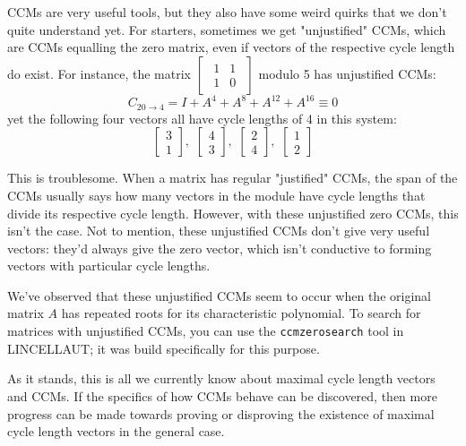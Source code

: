 \documentclass[a4paper, 12pt, reqno]{amsart}
\begin{document}
		CCMs are very useful tools, but they also have some weird quirks that we don't quite understand yet.
		For starters, sometimes we get "unjustified" CCMs, which are CCMs equalling the zero matrix, even if
		vectors of the respective cycle length do exist. For instance, the matrix 
		$
			\begin{bmatrix}
				\begin{smallmatrix}
					1 & 1 \\
					1 & 0
				\end{smallmatrix}
			\end{bmatrix}
		$	
		modulo 5 has unjustified CCMs:
		\[
			C_{20 \rightarrow 4} = I + A^4 + A^8 + A^{12} + A^{16} \equiv 0
		\]
		yet the following four vectors all have cycle lengths of 4 in this system:
		\[
			\begin{bmatrix}
				3 \\
				1
			\end{bmatrix}, \,\,
			\begin{bmatrix}
				4 \\
				3
			\end{bmatrix}, \,\,
			\begin{bmatrix}
				2 \\
				4
			\end{bmatrix}, \,\,
			\begin{bmatrix}
				1 \\
				2
			\end{bmatrix}
		\]
		
		This is troublesome. When a matrix has regular "justified" CCMs, the span of the CCMs usually says
		how many vectors in the module have cycle lengths that divide its respective cycle length. However,
		with these unjustified zero CCMs, this isn't the case. Not to mention, these unjustified CCMs don't
		give very useful vectors: they'd always give the zero vector, which isn't conductive to forming
		vectors with particular cycle lengths.
		
		We've observed that these unjustified CCMs seem to occur when the original matrix $A$ has repeated
		roots for its characteristic polynomial. To search for matrices with unjustified CCMs, you can use the 
		\texttt{ccmzerosearch} tool in LINCELLAUT; it was build specifically for this purpose.
		
		As it stands, this is all we currently know about maximal cycle length vectors and CCMs. If the
		specifics of how CCMs behave can be discovered, then more progress can be made towards proving or
		disproving the existence of maximal cycle length vectors in the general case.
		
\end{document}
